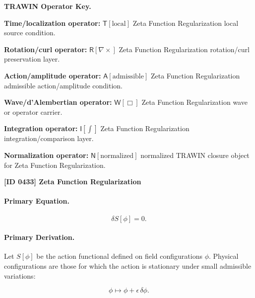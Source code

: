 \par\vspace{0.45\baselineskip}
\noindent\begin{minipage}[t]{\linewidth}
\begingroup
\small
\raggedright
\textbf{TRAWIN Operator Key.}\par
\noindent\textbf{Time/localization operator:} $\mathsf{T}\!\left[\mathrm{local}\right]$ Zeta Function Regularization local source condition.\par
\noindent\textbf{Rotation/curl operator:} $\mathsf{R}\!\left[\nabla\times\right]$ Zeta Function Regularization rotation/curl preservation layer.\par
\noindent\textbf{Action/amplitude operator:} $\mathsf{A}\!\left[\mathrm{admissible}\right]$ Zeta Function Regularization admissible action/amplitude condition.\par
\noindent\textbf{Wave/d'Alembertian operator:} $\mathsf{W}\!\left[\Box\right]$ Zeta Function Regularization wave or operator carrier.\par
\noindent\textbf{Integration operator:} $\mathsf{I}\!\left[\int\right]$ Zeta Function Regularization integration/comparison layer.\par
\noindent\textbf{Normalization operator:} $\mathsf{N}\!\left[\mathrm{normalized}\right]$ normalized TRAWIN closure object for Zeta Function Regularization.\par
\endgroup
\end{minipage}

\clearpage
\noindent\textbf{[ID 0433] Zeta Function Regularization}\par
\vspace{0.35em}
\paragraph{Primary Equation.}
\begin{equation}
\delta S[\phi]=0 .
\end{equation}

\paragraph{Primary Derivation.}
Let $S[\phi]$ be the action functional defined on field configurations $\phi$.  
Physical configurations are those for which the action is stationary under small admissible variations:

\begin{equation}
\phi \mapsto \phi+\epsilon\,\delta\phi .
\end{equation}

